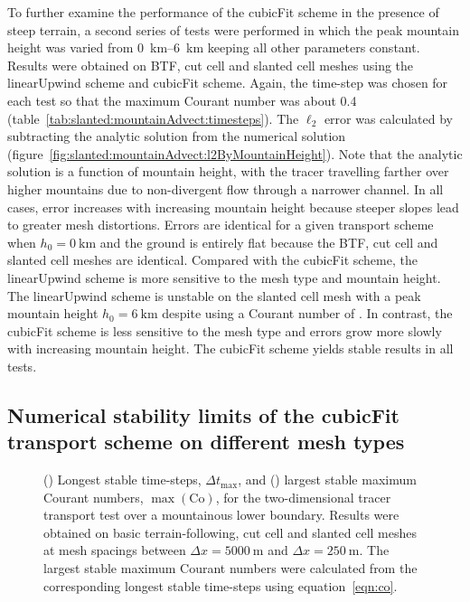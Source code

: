 To further examine the performance of the cubicFit scheme in the presence of steep terrain, a second series of tests were performed in which the peak mountain height was varied from \SIrange{0}{6}{\kilo\meter} keeping all other parameters constant.
Results were obtained on BTF, cut cell and slanted cell meshes using the linearUpwind scheme and cubicFit scheme.  Again, the time-step was chosen for each test so that the maximum Courant number was about \num{0.4} (table~\ref{tab:slanted:mountainAdvect:timesteps}).  The $\ell_2$ error was calculated by subtracting the analytic solution from the numerical solution (figure~\ref{fig:slanted:mountainAdvect:l2ByMountainHeight}).
Note that the analytic solution is a function of mountain height, with the tracer travelling farther over higher mountains due to non-divergent flow through a narrower channel.
In all cases, error increases with increasing mountain height because steeper slopes lead to greater mesh distortions.
Errors are identical for a given transport scheme when $h_0 = \SI{0}{\kilo\meter}$ and the ground is entirely flat because the BTF, cut cell and slanted cell meshes are identical.
Compared with the cubicFit scheme, the linearUpwind scheme is more sensitive to the mesh type and mountain height.  The linearUpwind scheme is unstable on the slanted cell mesh with a peak mountain height $h_0 = \SI{6}{\kilo\meter}$ despite using a Courant number of \unskip.
In contrast, the cubicFit scheme is less sensitive to the mesh type and errors grow more slowly with increasing mountain height.  The cubicFit scheme yields stable results in all tests.

\subsection{Numerical stability limits of the cubicFit transport scheme on different mesh types}

\begin{figure}
	\begin{subfigure}{\textwidth}
		\centering
		
		\label{fig:slanted:mountainAdvect:maxdt:dt}
		\label{fig:slanted:mountainAdvect:maxdt:co}
	\end{subfigure}
	\caption{() Longest stable time-steps, $\Delta t_\mathrm{max}$, and 
	() largest stable maximum Courant numbers, $\max(\mathrm{Co})$, for the two-dimensional tracer transport test over a mountainous lower boundary.  Results were obtained on basic terrain-following, cut cell and slanted cell meshes at mesh spacings between $\Delta x = \SI{5000}{\meter}$ and $\Delta x = \SI{250}{\meter}$.  The largest stable maximum Courant numbers were calculated from the corresponding longest stable time-steps using equation~\eqref{eqn:co}.}
	\label{fig:slanted:mountainAdvect:maxdt}
\end{figure}

